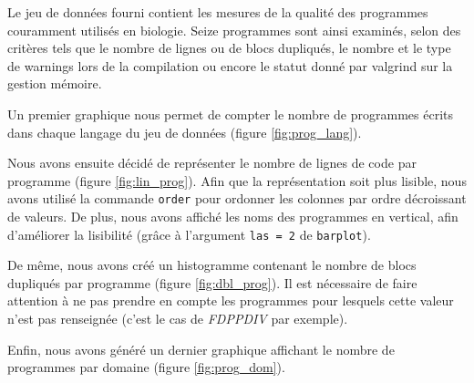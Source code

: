 Le jeu de données fourni contient les mesures de la qualité des
programmes couramment utilisés en biologie. Seize programmes
sont ainsi examinés, selon des critères tels que le nombre de lignes ou
de blocs dupliqués, le nombre et le type de warnings lors de la
compilation ou encore le statut donné par valgrind sur la gestion
mémoire.

Un premier graphique nous permet de compter le nombre de programmes
écrits dans chaque langage du jeu de données (figure \ref{fig:prog_lang}).

Nous avons ensuite décidé de représenter le nombre de lignes de code
par programme (figure \ref{fig:lin_prog}). Afin que la représentation
soit plus lisible, nous avons utilisé la commande \lstinline{order}
pour ordonner les colonnes par ordre décroissant de valeurs. De
plus, nous avons affiché les noms des programmes en vertical, afin
d'améliorer la lisibilité (grâce à l'argument \lstinline{las = 2} de
\lstinline{barplot}).

De même, nous avons créé un histogramme contenant le nombre de blocs
dupliqués par programme (figure \ref{fig:dbl_prog}). Il est nécessaire
de faire attention à ne pas prendre en compte les programmes pour
lesquels cette valeur n'est pas renseignée (c'est le cas de \emph{FDPPDIV}
par exemple).

Enfin, nous avons généré un dernier graphique affichant le nombre de
programmes par domaine (figure \ref{fig:prog_dom}).


